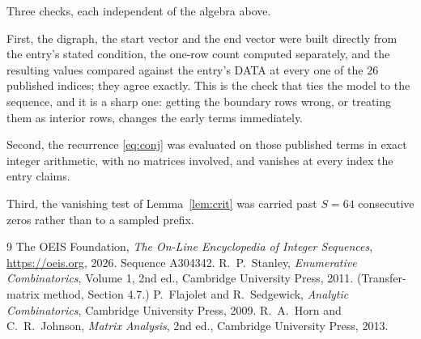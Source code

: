 \documentclass[11pt,a4paper]{article}
\theoremstyle{plain}
\theoremstyle{definition}
\begin{document}
Three checks, each independent of the algebra above.

First, the digraph, the start vector and the end vector were built directly from the
entry's stated condition, the one-row count computed separately, and the resulting values
compared against the entry's DATA at every one of the $26$ published indices; they
agree exactly. This is the check that ties the model to the sequence, and it is a sharp one:
getting the boundary rows wrong, or treating them as interior rows, changes the early terms
immediately.

Second, the recurrence \eqref{eq:conj} was evaluated on those published terms in exact
integer arithmetic, with no matrices involved, and vanishes at every index the entry claims.

Third, the vanishing test of Lemma~\ref{lem:crit} was carried past $S=64$ consecutive
zeros rather than to a sampled prefix.

\begin{thebibliography}{9}
 The OEIS Foundation, \emph{The On-Line Encyclopedia of Integer
Sequences}, \url{https://oeis.org}, 2026. Sequence A304342.
 R.~P.~Stanley, \emph{Enumerative Combinatorics}, Volume 1, 2nd ed.,
Cambridge University Press, 2011. (Transfer-matrix method, Section 4.7.)
 P.~Flajolet and R.~Sedgewick, \emph{Analytic Combinatorics}, Cambridge
University Press, 2009.
 R.~A.~Horn and C.~R.~Johnson, \emph{Matrix Analysis}, 2nd ed., Cambridge
University Press, 2013.
\end{thebibliography}
\end{document}
